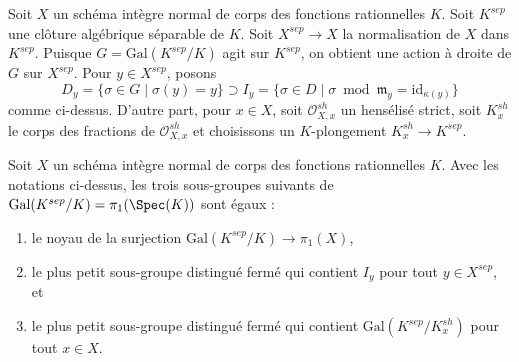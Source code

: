 \noindent
Soit $X$ un schéma intègre normal de corps des fonctions rationnelles $K$.
Soit $K^{sep}$ une clôture algébrique séparable de $K$.
Soit $X^{sep} \to X$ la normalisation de $X$ dans $K^{sep}$.
Puisque $G = \text{Gal}(K^{sep}/K)$ agit sur $K^{sep}$,
on obtient une action à droite de $G$ sur $X^{sep}$.
Pour $y \in X^{sep}$, posons
$$
D_y = \{\sigma \in G \mid \sigma(y) = y\} \supset
I_y = \{\sigma \in D \mid \sigma \bmod \mathfrak m_y =
\text{id}_{\kappa(y)} \}
$$
comme ci-dessus. D'autre part, pour $x \in X$,
soit $\mathcal{O}_{X, x}^{sh}$ un hensélisé strict,
soit $K_x^{sh}$ le corps des fractions de $\mathcal{O}_{X, x}^{sh}$
et choisissons un $K$-plongement $K_x^{sh} \to K^{sep}$.

\begin{lemma}
\label{lemma-normal-pione-quotient-inertia}
Soit $X$ un schéma intègre normal de corps des fonctions rationnelles $K$.
Avec les notations ci-dessus, les trois sous-groupes suivants de
$\text{Gal}(K^{sep}/K) = \pi_1(\Spec(K))$
sont égaux :
\begin{enumerate}
\item le noyau de la surjection
$\text{Gal}(K^{sep}/K) \longrightarrow \pi_1(X)$,
\item le plus petit sous-groupe distingué fermé qui contient $I_y$
pour tout $y \in X^{sep}$, et
\item le plus petit sous-groupe distingué fermé qui contient
$\text{Gal}(K^{sep}/K_x^{sh})$ pour tout $x \in  X$.
\end{enumerate}
\end{lemma}

